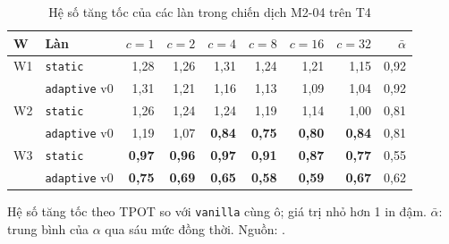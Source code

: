 \begin{table}[htbp]
\centering
\caption{Hệ số tăng tốc của các làn trong chiến dịch M2-04 trên T4}
\label{tab:m2}
\small
\begin{tabular}{@{}llrrrrrrr@{}}
\toprule
\textbf{W} & \textbf{Làn} & $c=1$ & $c=2$ & $c=4$ & $c=8$ & $c=16$ & $c=32$ & $\bar\alpha$ \\
\midrule
W1 & \texttt{static} & 1{,}28 & 1{,}26 & 1{,}31 & 1{,}24 & 1{,}21 & 1{,}15 & 0{,}92 \\
 & \texttt{adaptive} v0 & 1{,}31 & 1{,}21 & 1{,}16 & 1{,}13 & 1{,}09 & 1{,}04 & 0{,}92 \\
\midrule
W2 & \texttt{static} & 1{,}26 & 1{,}24 & 1{,}24 & 1{,}19 & 1{,}14 & 1{,}00 & 0{,}81 \\
 & \texttt{adaptive} v0 & 1{,}19 & 1{,}07 & \textbf{0{,}84} & \textbf{0{,}75} & \textbf{0{,}80} & \textbf{0{,}84} & 0{,}81 \\
\midrule
W3 & \texttt{static} & \textbf{0{,}97} & \textbf{0{,}96} & \textbf{0{,}97} & \textbf{0{,}91} & \textbf{0{,}87} & \textbf{0{,}77} & 0{,}55 \\
 & \texttt{adaptive} v0 & \textbf{0{,}75} & \textbf{0{,}69} & \textbf{0{,}65} & \textbf{0{,}58} & \textbf{0{,}59} & \textbf{0{,}67} & 0{,}62 \\
\bottomrule
\end{tabular}

\vspace{2pt}
{\footnotesize Hệ số tăng tốc theo TPOT so với \texttt{vanilla} cùng ô; giá trị nhỏ hơn 1 in đậm. $\bar\alpha$: trung bình của $\alpha$ qua sáu mức đồng thời. Nguồn: .}
\end{table}
